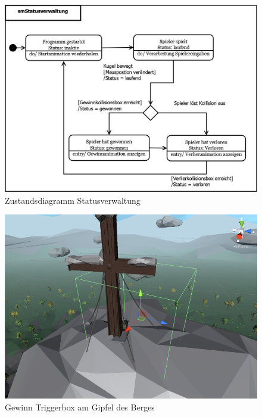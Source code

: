 \begin{figure}[H]
\centering
\caption{Zustandsdiagramm Statusverwaltung}
\label{Abb:SMStatus}
\includegraphics[width=\textwidth, height=0.5\textheight]{Bilder/Diagramme/smStatusverwaltung.png}
\end{figure}

\begin{figure}[H]
\centering
\caption{Gewinn Triggerbox am Gipfel des Berges}
\label{Abb:GewinnTrigger}
\includegraphics[scale=0.55]{Bilder/GewinnTrigger.png}
\end{figure}

